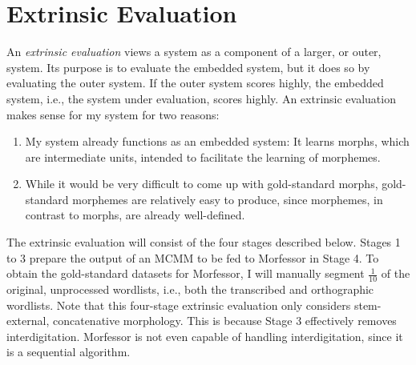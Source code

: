 \section{Extrinsic Evaluation} \label{sec:eval-extrinsic}
An \emph{extrinsic evaluation} views a system as a component of a larger, or outer, system. Its purpose is to evaluate the embedded system, but it does so by evaluating the outer system. If the outer system scores highly,
the embedded system, i.e., the system under evaluation, scores highly.
An extrinsic evaluation makes sense for my system for two reasons:
\begin{enumerate}
\item My system already functions as an embedded system: It learns morphs, which are intermediate units, intended to facilitate the learning of morphemes. %
\item While it would be very difficult to come up with gold-standard morphs, gold-standard morphemes are relatively easy to produce, since morphemes, in contrast to morphs, are already well-defined. 
\end{enumerate}

The extrinsic evaluation will consist of the four stages described below. 
Stages 1 to 3 prepare the output of an MCMM to be fed to Morfessor in Stage 4. 
To obtain the gold-standard datasets for Morfessor, I will manually segment 
$\frac{1}{10}$ of the original, unprocessed wordlists, i.e., both the transcribed and orthographic wordlists. 
Note that this four-stage extrinsic evaluation only considers stem-external, 
concatenative morphology. This is because Stage 3 effectively removes interdigitation.
Morfessor is not even capable of handling interdigitation, since it is a sequential algorithm.

